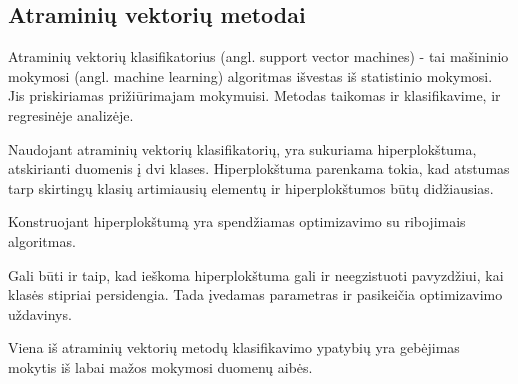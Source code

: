 \subsection{Atraminių vektorių metodai}

Atraminių vektorių klasifikatorius\cite{simkevicius06} (angl. support vector
machines) - tai mašininio mokymosi (angl. machine learning) algoritmas išvestas iš
statistinio mokymosi. Jis priskiriamas prižiūrimajam mokymuisi. Metodas taikomas
ir klasifikavime, ir regresinėje analizėje.


Naudojant atraminių vektorių klasifikatorių, yra sukuriama hiperplokštuma,
atskirianti duomenis į dvi klases. Hiperplokštuma parenkama tokia, kad atstumas
tarp skirtingų klasių artimiausių elementų ir hiperplokštumos būtų didžiausias.

Konstruojant hiperplokštumą yra spendžiamas optimizavimo su ribojimais
algoritmas.


Gali būti ir taip, kad ieškoma hiperplokštuma gali ir neegzistuoti pavyzdžiui,
kai klasės stipriai persidengia. Tada įvedamas parametras ir pasikeičia
optimizavimo uždavinys. %




Viena iš atraminių vektorių metodų klasifikavimo ypatybių yra gebėjimas mokytis
iš labai mažos mokymosi duomenų aibės.


